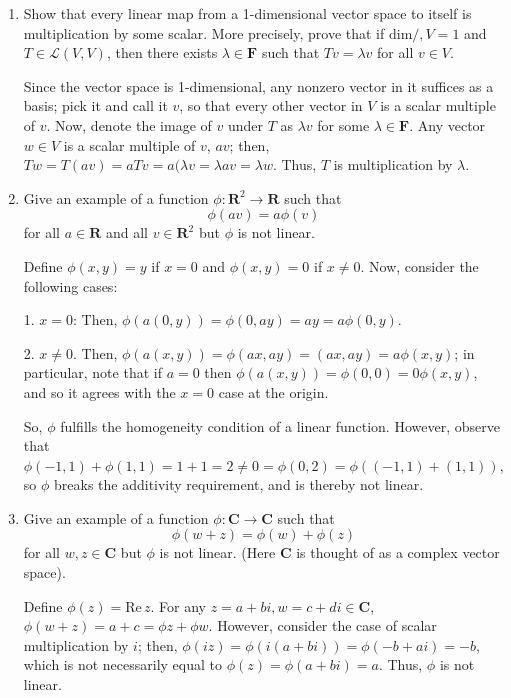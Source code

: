 \documentclass{book}
\begin{document}
\begin{enumerate}
\item Show that every linear map from a 1-dimensional vector space to itself is multiplication by some scalar.  More precisely, prove that if \(\textrm{dim} /, V=1\) and \(T \in \mathcal{L}(V,V)\), then there exists \(\lambda \in \textbf{F}\) such that \(Tv=\lambda{v}\) for all \(v \in V\).

Since the vector space is 1-dimensional, any nonzero vector in it suffices as a basis; pick it and call it \(v\), so that every other vector in \(V\) is a scalar multiple of \(v\).  Now, denote the image of \(v\) under \(T\) as \(\lambda{v}\) for some \(\lambda \in \textbf{F}\).  Any vector \(w \in V\) is a scalar multiple of \(v\), \(av\); then, \(Tw=T(av)=aTv=a(\lambda{v}=\lambda{av}=\lambda{w}\).  Thus, \(T\) is multiplication by \(\lambda\).

\item Give an example of a function \(\phi: \textbf{R}^2 \rightarrow \textbf{R}\) such that \[\phi(av)=a\phi(v)\] for all \(a \in \textbf{R}\) and all \(v \in \textbf{R}^2\) but \(\phi\) is not linear.

Define \(\phi(x,y)=y\) if \(x=0\) and \(\phi(x,y)=0\) if \(x \neq 0\).  Now, consider the following cases:

1.  \(x=0\): Then, \(\phi(a(0,y))=\phi(0,ay)=ay=a\phi(0,y)\).

2.  \(x \neq 0\).  Then, \(\phi(a(x,y))=\phi(ax,ay)=(ax,ay)=a\phi(x,y)\); in particular, note that if \(a=0\) then \(\phi(a(x,y))=\phi(0,0)=0\phi(x,y)\), and so it agrees with the \(x=0\) case at the origin.

So, \(\phi\) fulfills the homogeneity condition of a linear function.  However, observe that \(\phi(-1,1)+\phi(1,1)=1+1=2 \neq 0 = \phi(0,2)=\phi((-1,1)+(1,1))\), so \(\phi\) breaks the additivity requirement, and is thereby not linear.

\item Give an example of a function \(\phi: \textbf{C} \rightarrow \textbf{C}\) such that \[\phi(w+z)=\phi(w)+\phi(z)\] for all \(w,z \in \textbf{C}\) but \(\phi\) is not linear.  (Here \(\textbf{C}\) is thought of as a complex vector space).

Define \(\phi(z)=\textrm{Re} \, z\).  For any \(z=a+bi,w=c+di \in \textbf{C}\), \(\phi(w+z)=a+c=\phi{z}+\phi{w}\).  However, consider the case of scalar multiplication by \(i\); then, \(\phi(iz)=\phi(i(a+bi))=\phi(-b+ai)=-b\), which is not necessarily equal to \(\phi(z)=\phi(a+bi)=a\).  Thus, \(\phi\) is not linear.


\end{enumerate}
\end{document}
